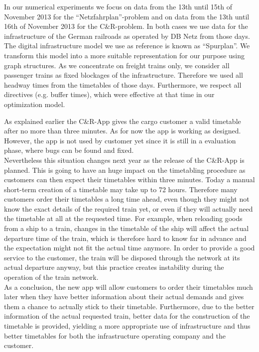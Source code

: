 In our numerical experiments we focus on data from the 13th until 15th of November 2013 for the ``Netzfahrplan''-problem and on data from the 13th until 16th of November 2013 for the C\&R-problem. In both cases we use data for the infrastructure of the German railroads as operated by DB Netz from those days. The digital infrastructure model we use as reference is known as ``Spurplan''. We transform this model into a more suitable representation for our purpose using graph structures. As we concentrate on freight trains only, we consider all passenger trains as fixed blockages of the infrastructure. Therefore we used all headway times from the timetables of those days. Furthermore, we respect all directives (e.g. buffer times), which were effective at that time in our optimization model.


As explained earlier the C\&R-App gives the cargo customer a valid timetable after no more than three minutes. As for now the app is working as designed. However, the app is not used by customer yet since it is still in a evaluation phase, where bugs can be found and fixed. \\
Nevertheless this situation changes next year as the release of the C\&R-App is planned. This is going to have an huge impact on the timetabling procedure as customers can then expect their timetables within three minutes. Today a manual short-term creation of a timetable may take up to 72 hours. Therefore many customers order their timetables a long time ahead, even though they might not know the exact details of the required train yet, or even if they will actually need the timetable at all at the requested time.
For example, when reloading goods from a ship to a train, changes in the timetable of the ship will affect the actual departure time of the train, which is therefore hard to know far in advance and the expectation might not fit the actual time anymore. In order to provide a good service to the customer, the train will be disposed through the network at its actual departure anyway, but this practice creates instability during the operation of the train network.\\
As a conclusion, the new app will allow customers to order their timetables much later when they have better information about their actual demands and gives them a chance to actually stick to their timetable. Furthermore, due to the better information of the actual requested train, better data for the construction of the timetable is provided, yielding a more appropriate use of infrastructure and thus better timetables for both the infrastructure operating company and the customer. \\
